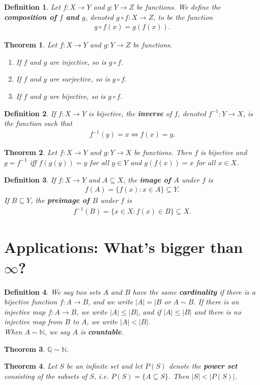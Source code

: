 \documentclass{article}
\theoremstyle{sltheorem}
\newtheorem{definition}{Definition}[section]
\newtheorem{theorem}{Theorem}[section]
\newcommand{\N}{\mathbb{N}}
\begin{document}
\begin{definition}
    Let $f:X\to Y$ and $g:Y\to Z$ be functions. We define the \textbf{composition of $f$ and $g$}, denoted $g\circ f:X\to Z$, to be the function
    \begin{align*}
        g\circ f(x) = g(f(x)).
    \end{align*}
\end{definition}
\begin{theorem}
    Let $f:X\to Y$ and $g:Y\to Z$ be functions.
    \begin{enumerate}
        \item If $f$ and $g$ are injective, so is $g\circ f$.
        \item If $f$ and $g$ are surjective, so is $g\circ f$.
        \item If $f$ and $g$ are bijective, so is $g\circ f$.
    \end{enumerate}
\end{theorem}
\begin{definition}
    If $f:X\to Y$ is bijective, the \textbf{inverse} of $f$, denoted $f^{-1}:Y\to X$, is the function such that
    \begin{align*}
        f^{-1}(y) = x \Leftrightarrow f(x) = y.
    \end{align*}
\end{definition}
\begin{theorem}
    Let $f:X\to Y$ and $g:Y\to X$ be functions. Then $f$ is bijective and $g=f^{-1}$ iff $f(g(y))= y$ for all $y\in Y$ and $g(f(x))=x$ for all $x\in X$.
\end{theorem}
\begin{definition}
    If $f:X\to Y$ and $A\subseteq X$, the \textbf{image of $A$} under $f$ is
    \begin{align*}
        f(A) = \{f(x):x\in A\}\subseteq Y.
    \end{align*}
    If $B\subseteq Y$, the \textbf{preimage of $B$} under $f$ is
    \begin{align*}
        f^{-1}(B) = \{x\in X:f(x)\in B\}\subseteq X.
    \end{align*}
\end{definition}
\section{Applications: What's bigger than $\infty$?}
\begin{definition}
    We say two sets $A$ and $B$ have the same \textbf{cardinality} if there is a bijective function $f:A\to B$, and we write $|A|=|B$ or $A\sim B$. If there is an injective map $f:A\to B$, we write $|A|\leq |B|$, and if $|A|\leq |B|$ and there is no injective map from $B$ to $A$, we write $|A|<|B|$.\\
    When $A\sim\N$, we say $A$ is \textbf{countable}.
\end{definition}
\begin{theorem}
    $\mathbb{Q}\sim\N$.
\end{theorem}
\begin{theorem}
    Let $S$ be an infinite set and let $P(S)$ denote the \textbf{power set} consisting of the subsets of $S$, i.e. $P(S) = \{A\subseteq S\}$. Then $|S|<|P(S)|$.
\end{theorem}
\end{document}
